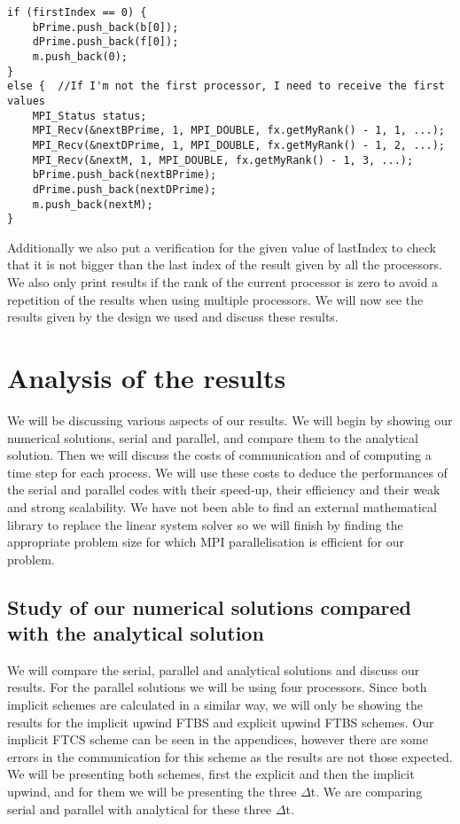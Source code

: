 \documentclass [10 pt, a4 paper]{report}
\begin{document}
\begin{lstlisting}[caption=Receive functions in ImplicitSchemes, label={lst:code1}, frame=single]
if (firstIndex == 0) {
	bPrime.push_back(b[0]);
	dPrime.push_back(f[0]);
	m.push_back(0);
}
else {	//If I'm not the first processor, I need to receive the first values
	MPI_Status status;
	MPI_Recv(&nextBPrime, 1, MPI_DOUBLE, fx.getMyRank() - 1, 1, ...);
	MPI_Recv(&nextDPrime, 1, MPI_DOUBLE, fx.getMyRank() - 1, 2, ...);
	MPI_Recv(&nextM, 1, MPI_DOUBLE, fx.getMyRank() - 1, 3, ...);
	bPrime.push_back(nextBPrime);
	dPrime.push_back(nextDPrime);
	m.push_back(nextM);
}
\end{lstlisting}

\noindent
Additionally we also put a verification for the given value of lastIndex to check that it is not bigger than the last index of the result given by all the processors. We also only print results if the rank of the current processor is zero to avoid a repetition of the results when using multiple processors. We will now see the results given by the design we used and discuss these results.




\chapter{Analysis of the results}
We will be discussing various aspects of our results. We will begin by showing our numerical solutions, serial and parallel, and compare them to the analytical solution. Then we will discuss the costs of communication and of computing a time step for each process. We will use these costs to deduce the performances of the serial and parallel codes with their speed-up, their efficiency and their weak and strong scalability. We have not been able to find an external mathematical library to replace the linear system solver so we will finish by finding the appropriate problem size for which MPI parallelisation is efficient for our problem.

\section{Study of our numerical solutions compared with the analytical solution}
We will compare the serial, parallel and analytical solutions and discuss our results. For the parallel solutions we will be using four processors. Since both implicit schemes are calculated in a similar way, we will only be showing the results for the implicit upwind FTBS and explicit upwind FTBS schemes. Our implicit FTCS scheme can be seen in the appendices, however there are some errors in the communication for this scheme as the results are not those expected. We will be presenting both schemes, first the explicit and then the implicit upwind, and for them we will be presenting the three $\Delta$t. We are comparing serial and parallel with analytical for these three $\Delta$t.
\end{document}
